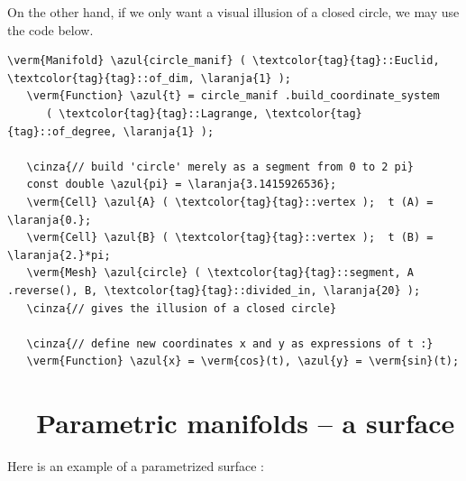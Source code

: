 On the other hand, if we only want a visual illusion of a closed circle, we may use the code below.

\begin{Verbatim}[commandchars=\\\{\},formatcom=\small\tt,baselinestretch=0.94]
   \verm{Manifold} \azul{circle_manif} ( \textcolor{tag}{tag}::Euclid, \textcolor{tag}{tag}::of_dim, \laranja{1} );
   \verm{Function} \azul{t} = circle_manif .build_coordinate_system
      ( \textcolor{tag}{tag}::Lagrange, \textcolor{tag}{tag}::of_degree, \laranja{1} );

   \cinza{// build 'circle' merely as a segment from 0 to 2 pi}
   const double \azul{pi} = \laranja{3.1415926536};
   \verm{Cell} \azul{A} ( \textcolor{tag}{tag}::vertex );  t (A) = \laranja{0.};
   \verm{Cell} \azul{B} ( \textcolor{tag}{tag}::vertex );  t (B) = \laranja{2.}*pi;
   \verm{Mesh} \azul{circle} ( \textcolor{tag}{tag}::segment, A .reverse(), B, \textcolor{tag}{tag}::divided_in, \laranja{20} );
   \cinza{// gives the illusion of a closed circle}

   \cinza{// define new coordinates x and y as expressions of t :}
   \verm{Function} \azul{x} = \verm{cos}(t), \azul{y} = \verm{sin}(t);
\end{Verbatim}


\section{~~Parametric manifolds -- a surface}\label{\numb section 2.\numb parag 20}

Here is an example of a parametrized surface :

